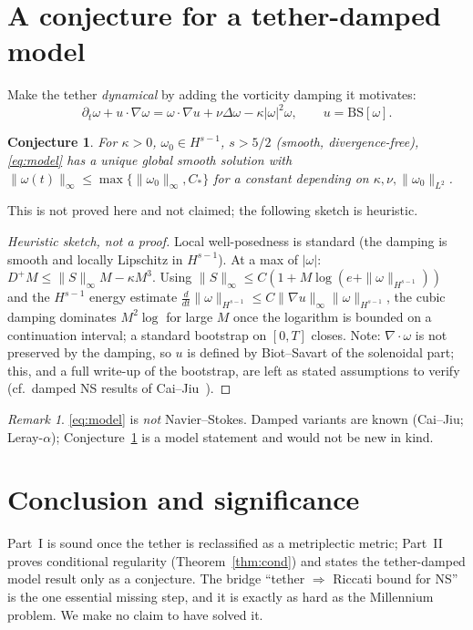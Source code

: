 \documentclass[11pt]{amsart}
\newtheorem{conjecture}[theorem]{Conjecture}
\theoremstyle{definition}\newtheorem{definition}[theorem]{Definition}
\theoremstyle{remark}\newtheorem{remark}[theorem]{Remark}
\begin{document}
\section{A conjecture for a tether-damped model}
Make the tether \emph{dynamical} by adding the vorticity damping it motivates:
\begin{equation}\label{eq:model}
\partial_t\omega+u\cdot\nabla\omega=\omega\cdot\nabla u+\nu\Delta\omega-\kappa|\omega|^{2}\omega,\qquad u=\mathrm{BS}[\omega].
\end{equation}
\begin{conjecture}\label{thm:model}
For $\kappa>0$, $\omega_0\in H^{s-1}$, $s>5/2$ (smooth, divergence-free), \eqref{eq:model} has a unique global smooth solution with
$\|\omega(t)\|_\infty\le \max\{\|\omega_0\|_\infty, C_*\}$ for a constant depending on $\kappa,\nu,\|\omega_0\|_{L^2}$.
\end{conjecture}
\noindent This is not proved here and not claimed; the following sketch is heuristic.
\begin{proof}[Heuristic sketch, not a proof]
Local well-posedness is standard (the damping is smooth and locally Lipschitz in $H^{s-1}$). At a max of $|\omega|$: $D^+M\le \|S\|_\infty M-\kappa M^3$. Using $\|S\|_\infty\le C(1+M\log(e+\|\omega\|_{H^{s-1}}))$ and the $H^{s-1}$ energy estimate $\frac{d}{dt}\|\omega\|_{H^{s-1}}\le C\|\nabla u\|_\infty\|\omega\|_{H^{s-1}}$, the cubic damping dominates $M^2\log$ for large $M$ once the logarithm is bounded on a continuation interval; a standard bootstrap on $[0,T]$ closes. Note: $\nabla\cdot\omega$ is not preserved by the damping, so $u$ is defined by Biot--Savart of the solenoidal part; this, and a full write-up of the bootstrap, are left as stated assumptions to verify (cf.\ damped NS results of Cai--Jiu~\cite{CaiJiu}).
\end{proof}
\begin{remark}\eqref{eq:model} is \emph{not} Navier--Stokes. Damped variants are known (Cai--Jiu; Leray-$\alpha$); Conjecture~\ref{thm:model} is a model statement and would not be new in kind.\end{remark}

\section{Conclusion and significance}
Part~I is sound once the tether is reclassified as a metriplectic metric; Part~II proves conditional regularity
(Theorem~\ref{thm:cond}) and states the tether-damped model result only as a conjecture. The bridge ``tether $\Rightarrow$ Riccati bound for NS'' is the one essential missing step, and it is
exactly as hard as the Millennium problem. We make no claim to have solved it.
\end{document}
